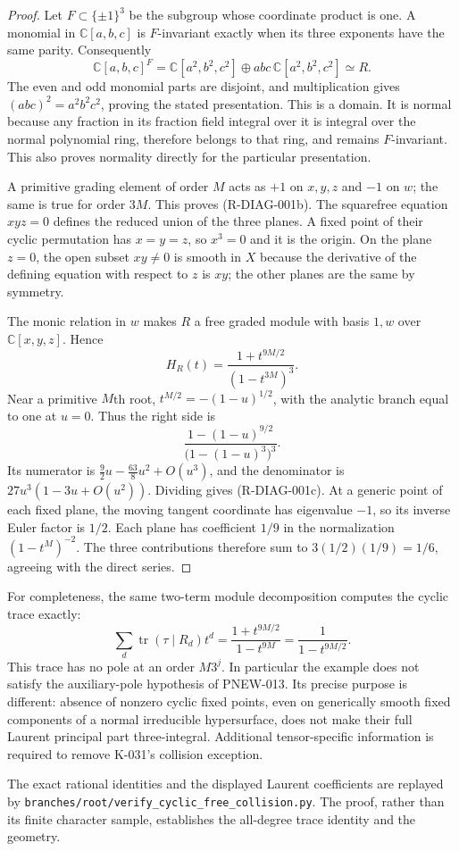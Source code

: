 \begin{proof}
Let $F\subset\{\pm1\}^3$ be the subgroup whose coordinate product
is one. A monomial in $\mathbb C[a,b,c]$ is $F$-invariant exactly
when its three exponents have the same parity. Consequently
\[
 \mathbb C[a,b,c]^F
 =\mathbb C[a^2,b^2,c^2]\oplus abc\,\mathbb C[a^2,b^2,c^2]
 \simeq R.
\]
The even and odd monomial parts are disjoint, and multiplication
gives $(abc)^2=a^2b^2c^2$, proving the stated presentation. This is
a domain. It is normal because any fraction in its fraction field
integral over it is integral over the normal polynomial ring,
therefore belongs to that ring, and remains $F$-invariant. This
also proves normality directly for the particular presentation.

A primitive grading element of order $M$ acts as $+1$ on $x,y,z$
and $-1$ on $w$; the same is true for order $3M$. This proves
(R-DIAG-001b). The squarefree equation $xyz=0$ defines the reduced
union of the three planes. A fixed point of their cyclic permutation
has $x=y=z$, so $x^3=0$ and it is the origin. On the plane $z=0$,
the open subset $xy\ne0$ is smooth in $X$ because the derivative
of the defining equation with respect to $z$ is $xy$; the other
planes are the same by symmetry.

The monic relation in $w$ makes $R$ a free graded module with basis
$1,w$ over $\mathbb C[x,y,z]$. Hence
\[
 H_R(t)=\frac{1+t^{9M/2}}{(1-t^{3M})^3}.
                                                        \tag{R-DIAG-001d}
\]
Near a primitive $M$th root, $t^{M/2}=-(1-u)^{1/2}$, with the
analytic branch equal to one at $u=0$. Thus the right side is
\[
 \frac{1-(1-u)^{9/2}}{\bigl(1-(1-u)^3\bigr)^3}.
\]
Its numerator is $\tfrac92u-\tfrac{63}8u^2+O(u^3)$, and the
denominator is $27u^3(1-3u+O(u^2))$. Dividing gives
(R-DIAG-001c). At a generic point of each fixed plane, the moving
tangent coordinate has eigenvalue $-1$, so its inverse Euler
factor is $1/2$. Each plane has coefficient $1/9$ in the
normalization $(1-t^M)^{-2}$. The three contributions therefore
sum to $3(1/2)(1/9)=1/6$, agreeing with the direct series.
\end{proof}

For completeness, the same two-term module decomposition computes
the cyclic trace exactly:
\[
 \sum_d\operatorname{tr}(\tau\mid R_d)t^d
 =\frac{1+t^{9M/2}}{1-t^{9M}}
 =\frac1{1-t^{9M/2}}.
                                                        \tag{R-DIAG-001e}
\]
This trace has no pole at an order $M3^j$. In particular the
example does not satisfy the auxiliary-pole hypothesis of
PNEW-013. Its precise purpose is different: absence of nonzero
cyclic fixed points, even on generically smooth fixed components
of a normal irreducible hypersurface, does not make their full
Laurent principal part three-integral. Additional tensor-specific
information is required to remove K-031's collision exception.

The exact rational identities and the displayed Laurent coefficients
are replayed by
\nolinkurl{branches/root/verify_cyclic_free_collision.py}.
The proof, rather than its finite character sample, establishes
the all-degree trace identity and the geometry.
